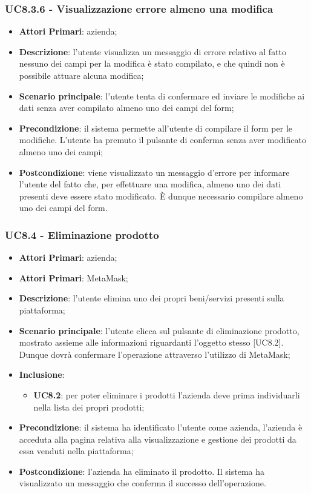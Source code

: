 \subsubsection{UC8.3.6 - Visualizzazione errore almeno una modifica}
\begin{itemize}
	\item \textbf{Attori Primari}: azienda;
	\item \textbf{Descrizione}:
	l'utente visualizza un messaggio di errore relativo al fatto nessuno dei campi per la modifica è stato compilato, e che quindi non è possibile attuare alcuna modifica;
	\item \textbf{Scenario principale}: l'utente tenta di confermare ed inviare le modifiche ai dati senza aver compilato almeno uno dei campi del form;
	\item \textbf{Precondizione}: il sistema permette all'utente di compilare il form per le modifiche. L'utente ha premuto il pulsante di conferma senza aver modificato almeno uno dei campi; 
	\item \textbf{Postcondizione}:
	viene visualizzato un messaggio d'errore per informare l'utente del fatto che, per effettuare una modifica, almeno uno dei dati presenti deve essere stato modificato. È dunque necessario compilare almeno uno dei campi del form.
\end{itemize}

\subsubsection{UC8.4 - Eliminazione prodotto}
\begin{itemize}
	\item \textbf{Attori Primari}: azienda;
	\item \textbf{Attori Primari}: MetaMask\glo;
	\item \textbf{Descrizione}:
	l'utente elimina uno dei propri beni/servizi presenti sulla piattaforma;
	\item \textbf{Scenario principale}: l'utente clicca sul pulsante di eliminazione prodotto, mostrato assieme alle informazioni riguardanti l'oggetto stesso [UC8.2]. Dunque dovrà confermare l'operazione attraverso l'utilizzo di MetaMask\glo;
	\item \textbf{Inclusione}:
	\begin{itemize}
		\item \textbf{UC8.2}: per poter eliminare i prodotti l'azienda deve prima individuarli nella lista dei propri prodotti;
	\end{itemize}
	\item \textbf{Precondizione}: il sistema ha identificato l'utente come azienda, l'azienda è acceduta alla pagina relativa alla visualizzazione e gestione dei prodotti da essa venduti nella piattaforma;
	\item \textbf{Postcondizione}: l'azienda ha eliminato il prodotto. Il sistema ha visualizzato un messaggio che conferma il successo dell'operazione.
\end{itemize}


